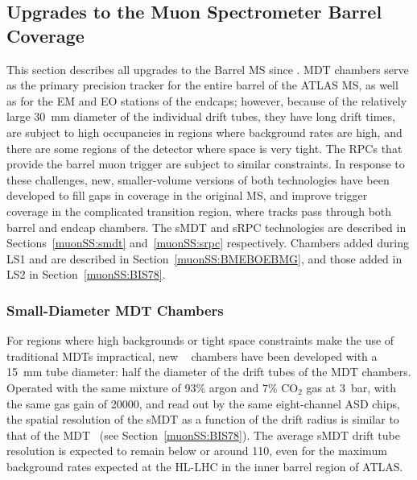 \documentclass[cernpreprint, atlasdraft=false, UKenglish,british,orcidlogo, texmf, orcidlogo]{atlasdoc}
\begin{document}
 
 
 

\subsection{Upgrades to the Muon Spectrometer Barrel Coverage} 
This section describes all upgrades to the Barrel \gls{MS} since \RunOne.
\gls{MDT} chambers serve as the primary precision tracker for the entire barrel of the ATLAS \gls{MS}, as well as for the EM and EO stations of the endcaps; however, because of the relatively large \SI{30}{\mm} diameter of the individual drift tubes, they have long drift times, are subject to high occupancies in regions where background rates are high, and there are some regions of the detector where space is very tight.
The \glspl{RPC} that provide the barrel muon trigger are subject to similar constraints.
In response to these challenges, new, smaller-volume versions of both technologies have been developed to fill gaps in coverage in the original \gls{MS}, and improve trigger coverage in the complicated transition region, where tracks pass through both barrel and endcap chambers. The \gls{sMDT} and \gls{sRPC} technologies are described in Sections~\ref{muonSS:smdt} and~\ref{muonSS:srpc} respectively.
Chambers added during \gls{LS1} and \RunTwo are described in  Section~\ref{muonSS:BMEBOEBMG}, and those added in \gls{LS2} in Section~\ref{muonSS:BIS78}.
 
\subsubsection{Small-Diameter MDT Chambers \label{muonSS:smdt}}
For regions where high backgrounds or tight space constraints make the use of traditional \glspl{MDT} impractical, new ~\cite{sMDT1,sMDT2} chambers have been developed
with a \SI{15}{\mm} tube diameter: half the diameter of the drift tubes of the \gls{MDT} chambers. Operated with the same mixture of 93\% argon and 7\% CO$_2$ gas at \SI{3}{\bar}, with the same gas gain of \num{20000}, and read out by the same eight-channel
ASD chips, the spatial resolution of the \gls{sMDT} as a function of the drift radius is similar to that of the \gls{MDT}~\cite{sMDT_res}
(see
Section~\ref{muonSS:BIS78}).
The average \gls{sMDT} drift tube resolution is expected to remain below or around \SI{110}{\micron}, even for the maximum background rates expected at the \gls{HL-LHC} in the inner barrel region of ATLAS.
 
\end{document}
